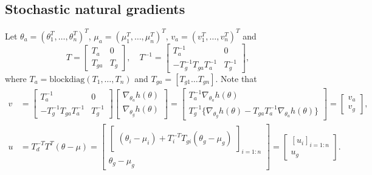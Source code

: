 \documentclass{statsoc}
\newcommand\blockdiag{{\text{blockdiag}}}
\begin{document}
\subsection{Stochastic natural gradients}
Let $\theta_a = (\theta_1^T, \dots, \theta_n^T)^T$,  $\mu_a = (\mu_1^T, \dots, \mu_n^T)^T$, $v_a=(v_1^T, \dots, v_n^T)^T$  and
\[
T = \begin{bmatrix} T_a & 0 \\ T_{ga} & T_g \end{bmatrix}, \quad 
T^{-1} = \begin{bmatrix} T_a^{-1} & 0 \\ - T_g^{-1} T_{ga}  T_a^{-1} & T_g^{-1} \end{bmatrix}, 
\]
where $T_a = \blockdiag(T_1, \dots, T_n)$ and $T_{ga} = [T_{g1} \dots T_{gn}]$. 
Note that 
\[
\begin{aligned}
v &= \begin{bmatrix} T_a^{-1} & 0 \\ - T_g^{-1} T_{ga}  T_a^{-1} & T_g^{-1} \end{bmatrix} \begin{bmatrix} \nabla_{\theta_a} h(\theta)  \\ \nabla_{\theta_g} h(\theta)  \end{bmatrix}
= \begin{bmatrix}
T_a^{-1} \nabla_{\theta_a} h(\theta) \\
T_g^{-1} \{\nabla_{\theta_g} h(\theta) - T_{ga}  T_a^{-1} \nabla_{\theta_a} h(\theta)\} \end{bmatrix}
= \begin{bmatrix} v_a \\ v_g \end{bmatrix}, \\
u &=T_d^{-T} T^T (\theta -\mu)  = \begin{bmatrix}
\begin{bmatrix} (\theta_i - \mu_i) + T_i^{-T} T_{gi} (\theta_g - \mu_g) \end{bmatrix}_{i=1:n} \\
\theta_g - \mu_g \end{bmatrix} = 
\begin{bmatrix} [u_i]_{i=1:n} \\ u_g \end{bmatrix}.
\end{aligned}
\]
\end{document}
